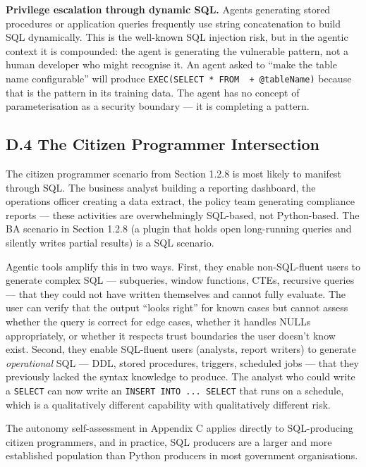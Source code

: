 \documentclass[a4paper,11pt]{report}
\begin{document}
\textbf{Privilege escalation through dynamic SQL.} Agents generating
stored procedures or application queries frequently use string
concatenation to build SQL dynamically. This is the well-known SQL
injection risk, but in the agentic context it is compounded: the agent
is generating the vulnerable pattern, not a human developer who might
recognise it. An agent asked to ``make the table name configurable''
will produce
\texttt{EXEC(\textquotesingle{}SELECT\ *\ FROM\ \textquotesingle{}\ +\ @tableName)}
because that is the pattern in its training data. The agent has no
concept of parameterisation as a security boundary --- it is completing
a pattern.

\hypertarget{d.4-the-citizen-programmer-intersection}{%
\subsection{D.4 The Citizen Programmer
Intersection}\label{d.4-the-citizen-programmer-intersection}}

The citizen programmer scenario from Section 1.2.8 is most likely to
manifest through SQL. The business analyst building a reporting
dashboard, the operations officer creating a data extract, the policy
team generating compliance reports --- these activities are
overwhelmingly SQL-based, not Python-based. The BA scenario in Section
1.2.8 (a plugin that holds open long-running queries and silently writes
partial results) is a SQL scenario.

Agentic tools amplify this in two ways. First, they enable
non-SQL-fluent users to generate complex SQL --- subqueries, window
functions, CTEs, recursive queries --- that they could not have written
themselves and cannot fully evaluate. The user can verify that the
output ``looks right'' for known cases but cannot assess whether the
query is correct for edge cases, whether it handles NULLs appropriately,
or whether it respects trust boundaries the user doesn't know exist.
Second, they enable SQL-fluent users (analysts, report writers) to
generate \emph{operational} SQL --- DDL, stored procedures, triggers,
scheduled jobs --- that they previously lacked the syntax knowledge to
produce. The analyst who could write a \texttt{SELECT} can now write an
\texttt{INSERT\ INTO\ ...\ SELECT} that runs on a schedule, which is a
qualitatively different capability with qualitatively different risk.

The autonomy self-assessment in Appendix C applies directly to
SQL-producing citizen programmers, and in practice, SQL producers are a
larger and more established population than Python producers in most
government organisations.
\end{document}
